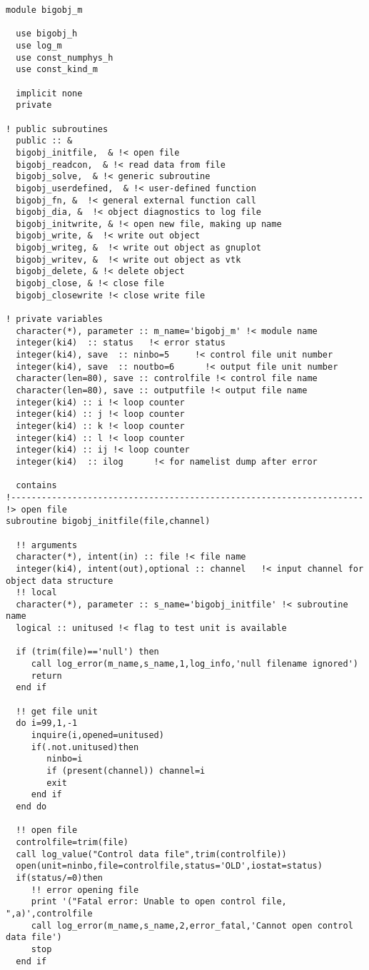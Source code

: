 \small
\begin{verbatim}
module bigobj_m

  use bigobj_h
  use log_m
  use const_numphys_h
  use const_kind_m

  implicit none
  private

! public subroutines
  public :: &
  bigobj_initfile,  & !< open file
  bigobj_readcon,  & !< read data from file
  bigobj_solve,  & !< generic subroutine
  bigobj_userdefined,  & !< user-defined function
  bigobj_fn, &  !< general external function call
  bigobj_dia, &  !< object diagnostics to log file
  bigobj_initwrite, & !< open new file, making up name
  bigobj_write, &  !< write out object
  bigobj_writeg, &  !< write out object as gnuplot
  bigobj_writev, &  !< write out object as vtk
  bigobj_delete, & !< delete object
  bigobj_close, & !< close file
  bigobj_closewrite !< close write file

! private variables
  character(*), parameter :: m_name='bigobj_m' !< module name
  integer(ki4)  :: status   !< error status
  integer(ki4), save  :: ninbo=5     !< control file unit number
  integer(ki4), save  :: noutbo=6      !< output file unit number
  character(len=80), save :: controlfile !< control file name
  character(len=80), save :: outputfile !< output file name
  integer(ki4) :: i !< loop counter
  integer(ki4) :: j !< loop counter
  integer(ki4) :: k !< loop counter
  integer(ki4) :: l !< loop counter
  integer(ki4) :: ij !< loop counter
  integer(ki4)  :: ilog      !< for namelist dump after error

  contains
!---------------------------------------------------------------------
!> open file
subroutine bigobj_initfile(file,channel)

  !! arguments
  character(*), intent(in) :: file !< file name
  integer(ki4), intent(out),optional :: channel   !< input channel for object data structure
  !! local
  character(*), parameter :: s_name='bigobj_initfile' !< subroutine name
  logical :: unitused !< flag to test unit is available

  if (trim(file)=='null') then
     call log_error(m_name,s_name,1,log_info,'null filename ignored')
     return
  end if

  !! get file unit
  do i=99,1,-1
     inquire(i,opened=unitused)
     if(.not.unitused)then
        ninbo=i
        if (present(channel)) channel=i
        exit
     end if
  end do

  !! open file
  controlfile=trim(file)
  call log_value("Control data file",trim(controlfile))
  open(unit=ninbo,file=controlfile,status='OLD',iostat=status)
  if(status/=0)then
     !! error opening file
     print '("Fatal error: Unable to open control file, ",a)',controlfile
     call log_error(m_name,s_name,2,error_fatal,'Cannot open control data file')
     stop
  end if


\end{verbatim}

